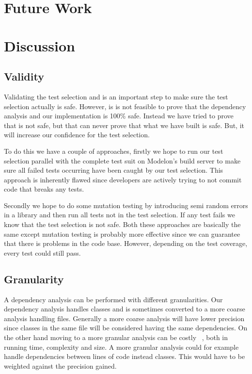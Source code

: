 \documentclass{cslthse-msc}
\begin{document}
\chapter[Future Work]{Future Work}
	
\chapter[Discussion]{Discussion}

\section{Validity}
Validating the test selection and is an important step to make sure the test selection actually is safe. 
However, is is not feasible to prove that the dependency analysis and our implementation is 100\% safe. Instead we have tried to prove that is not safe, but that can never prove that what we have built is safe. But, it will increase our confidence for the test selection. 

To do this we have a couple of approaches, firstly we hope to run our test selection parallel with the complete test suit on Modelon's build server to make sure all failed tests occurring have been caught by our test selection. This approach is inherently flawed since developers are actively trying to not commit code that breaks any tests. %


Secondly we hope to do some mutation testing by introducing semi random errors in a library and then run all tests not in the test selection. If any test fails we know that the test selection is not safe. Both these approaches are basically the same except mutation testing is probably more effective since we can guarantee that there is problems in the code base. However, depending on the test coverage, every test could still pass.


\section{Granularity}
A dependency analysis can be performed with different granularities. Our dependency analysis handles classes and is sometimes converted to a more coarse analysis handling files. Generally a more coarse analysis will have lower precision since classes in the same file will be considered having the same dependencies. On the other hand moving to a more granular analysis can be costly ~\cite{DBLP:conf/sigsoft/LegunsenHSLZM16}, both in running time, complexity and size. A more granular analysis could for example handle dependencies between lines of code instead classes. This would have to be weighted against the precision gained.
\end{document}
